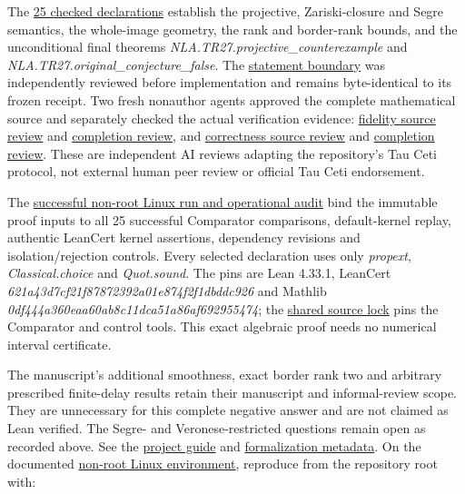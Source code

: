 \documentclass[11pt,a4paper]{article}
\begin{document}
The
\href{https://github.com/ajt60gaibb/OpenProblemsInNLA/blob/775e8b169119c4045b07db7666eda8c001ae3bd1/tensor-computations/TR-27/lean/Solution.lean}{25
checked declarations} establish the projective, Zariski-closure and
Segre semantics, the whole-image geometry, the rank and border-rank
bounds, and the unconditional final theorems
\textit{NLA.TR27.projective\_counterexample} and
\textit{NLA.TR27.original\_conjecture\_false}. The
\href{https://github.com/ajt60gaibb/OpenProblemsInNLA/blob/main/tensor-computations/TR-27/lean/Challenge.lean}{statement
boundary} was independently reviewed before implementation and remains
byte-identical to its frozen receipt. Two fresh nonauthor agents
approved the complete mathematical source and separately checked the
actual verification evidence:
\href{https://github.com/ajt60gaibb/OpenProblemsInNLA/blob/main/tensor-computations/TR-27/lean/reviews/final-fidelity-referee.md}{fidelity
source review} and
\href{https://github.com/ajt60gaibb/OpenProblemsInNLA/blob/main/tensor-computations/TR-27/lean/reviews/final-fidelity-completion.md}{completion
review}, and
\href{https://github.com/ajt60gaibb/OpenProblemsInNLA/blob/main/tensor-computations/TR-27/lean/reviews/final-correctness-referee.md}{correctness
source review} and
\href{https://github.com/ajt60gaibb/OpenProblemsInNLA/blob/main/tensor-computations/TR-27/lean/reviews/final-correctness-completion.md}{completion
review}. These are independent AI reviews adapting the repository's Tau
Ceti protocol, not external human peer review or official Tau Ceti
endorsement.

The
\href{https://github.com/ajt60gaibb/OpenProblemsInNLA/blob/main/tensor-computations/TR-27/lean/verification/linux/OPERATIONAL-REVIEW.md}{successful
non-root Linux run and operational audit} bind the immutable proof
inputs to all 25 successful Comparator comparisons, default-kernel
replay, authentic LeanCert kernel assertions, dependency revisions and
isolation/rejection controls. Every selected declaration uses only
\textit{propext}, \textit{Classical.choice} and \textit{Quot.sound}. The
pins are Lean 4.33.1, LeanCert
\textit{621a43d7cf21f87872392a01e874f2f1dbddc926} and Mathlib
\textit{0df444a360eaa60ab8c11dca51a86af692955474}; the
\href{https://github.com/ajt60gaibb/OpenProblemsInNLA/blob/main/tools/lean/source-lock.json}{shared
source lock} pins the Comparator and control tools. This exact algebraic
proof needs no numerical interval certificate.

The manuscript's additional smoothness, exact border rank two and
arbitrary prescribed finite-delay results retain their manuscript and
informal-review scope. They are unnecessary for this complete negative
answer and are not claimed as Lean verified. The Segre- and
Veronese-restricted questions remain open as recorded above. See the
\href{https://github.com/ajt60gaibb/OpenProblemsInNLA/blob/main/tensor-computations/TR-27/lean/README.md}{project
guide} and
\href{https://github.com/ajt60gaibb/OpenProblemsInNLA/blob/main/tensor-computations/TR-27/lean/formalization.yaml}{formalization
metadata}. On the documented
\href{https://github.com/ajt60gaibb/OpenProblemsInNLA/blob/main/docs/lean/README.md}{non-root
Linux environment}, reproduce from the repository root with:
\end{document}

